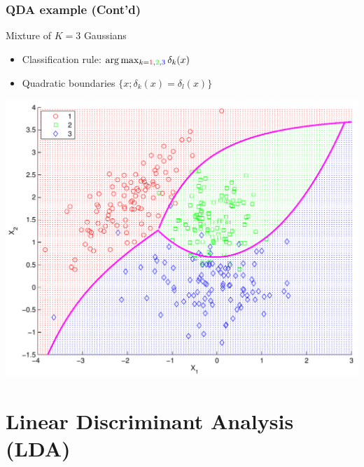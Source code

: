 \documentclass[compress, smaller, serif, 9pt]{beamer}
\begin{document}
\begin{frame}
  \frametitle{QDA example (Cont'd)}
\begin{block}{Mixture of $K=3$ Gaussians}
\begin{itemize}
   \item  Classification rule: $\arg \max_{k=\textcolor{red}{1},\textcolor{green}{2},\textcolor{blue}{3}}
\delta_k(x)$
\item Quadratic boundaries $\{ x ; \delta_k(x)=\delta_l(x) \} $
\end{itemize}
\end{block}
\vspace*{-5mm}

\begin{center}
  \includegraphics[width=.65\textwidth]{quad_analysis_bounds.pdf} \\
\end{center}

\end{frame}



\section{Linear Discriminant Analysis  (LDA)}
\end{document}
